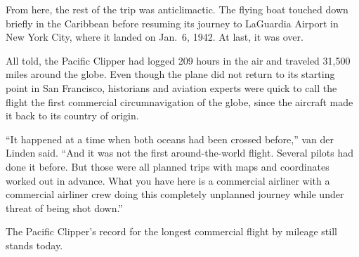 \documentclass[12pt]{article}
\begin{document}
From here, the rest of the trip was anticlimactic. The flying boat touched down briefly in the Caribbean before resuming its journey to LaGuardia Airport in New York City, where it landed on Jan.~6, 1942. At last, it was over.

All told, the Pacific Clipper had logged 209 hours in the air and traveled 31,500 miles around the globe. Even though the plane did not return to its starting point in San Francisco, historians and aviation experts were quick to call the flight the first commercial circumnavigation of the globe, since the aircraft made it back to its country of origin.

``It happened at a time when both oceans had been crossed before,'' van der Linden said. ``And it was not the first around-the-world flight. Several pilots had done it before. But those were all planned trips with maps and coordinates worked out in advance. What you have here is a commercial airliner with a commercial airliner crew doing this completely unplanned journey while under threat of being shot down.''

The Pacific Clipper’s record for the longest commercial flight by mileage still stands today.
\end{document}
